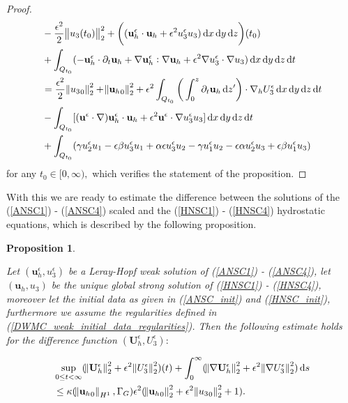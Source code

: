 \documentclass[11pt]{article}
\newtheorem{prop}{Proposition}
\newcommand*\diff{\mathop{}\!\mathrm{d}}
\begin{document}
\begin{proof}
\begin{equation}
\begin{split}
& - \frac{\epsilon^2}{2} \norm{u_3(t_0)}_2^2 + \bigg ( (\mathbf{u}_h^\epsilon \cdot \mathbf{u}_h + \epsilon^2 u_3^\epsilon u_3) \diff x \diff y \diff z \bigg ) (t_0) \\
& + \int_{Q_{t_0}} (-\mathbf{u}_h^\epsilon \cdot \partial_t \mathbf{u}_h + \nabla \mathbf{u}_h^\epsilon : \nabla \mathbf{u}_h + \epsilon^2 \nabla u_3^\epsilon \cdot \nabla u_3) \diff x \diff y \diff z \diff t \\
& = \frac{\epsilon^2}{2} \norm{{u_3}_0}_2^2 + \norm{{\mathbf{u}_h}_0}_2^2 + \epsilon^2 \int_{Q_{t_0}} \bigg ( \int_0^z \partial_t \mathbf{u}_h \diff z' \bigg ) \cdot \nabla_h U_3^\epsilon \diff x \diff y \diff z \diff t \\
& - \int_{Q_{t_0}} [(\mathbf{u}^\epsilon \cdot \nabla) \mathbf{u}_h^\epsilon \cdot \mathbf{u}_h + \epsilon^2 \mathbf{u}^\epsilon \cdot \nabla u_3^\epsilon u_3] \diff x \diff y \diff z \diff t \\
& + \int_{Q_{t_0}} ( \gamma u_2^\epsilon u_1 - \epsilon \beta u_3^\epsilon u_1 + \alpha \epsilon u_3^\epsilon u_2 - \gamma u_1^\epsilon u_2 - \epsilon \alpha u_2^\epsilon u_3 + \epsilon \beta u_1^\epsilon u_3)
\end{split}
\end{equation}
%
for any $t_0 \in [0, \infty),$ which verifies the statement of the proposition.

\end{proof}

With this we are ready to estimate the difference between the solutions of the (\ref{ANSC1}) - (\ref{ANSC4}) scaled and the (\ref{HNSC1}) - (\ref{HNSC4}) hydrostatic equations, which is described by the following proposition.

\begin{prop} \label{convrateweakframework}

Let $(\mathbf{u}_h^\epsilon, u_3^\epsilon)$ be a Leray-Hopf weak solution of (\ref{ANSC1}) - (\ref{ANSC4}), let $(\mathbf{u}_h,u_3)$ be the unique global strong solution of (\ref{HNSC1}) - (\ref{HNSC4}), moreover let the initial data as given in (\ref{ANSC_init}) and (\ref{HNSC_init}), furthermore we assume the regularities defined in (\ref{DWMC_weak_initial_data_regularities}). Then the following estimate holds for the difference function $(\mathbf{U}_h^\epsilon, U_3^\epsilon):$

\begin{equation}\label{horizontal_velocities_convergence}
\begin{split}
& \sup_{0 \leq t < \infty} ( \norm{\mathbf{U}_h^\epsilon}_2^2 + \epsilon^2 \norm{U_3^\epsilon}_2^2)(t) + \int_0 ^ \infty ( \norm{\nabla \mathbf{U}_h^\epsilon}_2^2 + \epsilon^2 \norm{\nabla U_3^\epsilon}_2^2)\diff s \\
& \leq \kappa (\norm{{\mathbf{u}_h}_0}_{H^1}, \Gamma_G) \epsilon^2 (\norm{{\mathbf{u}_h}_0}_2^2 + \epsilon^2 \norm{{u_3}_0}_2^2 + 1).
\end{split}
\end{equation}

\end{prop}
\end{document}
